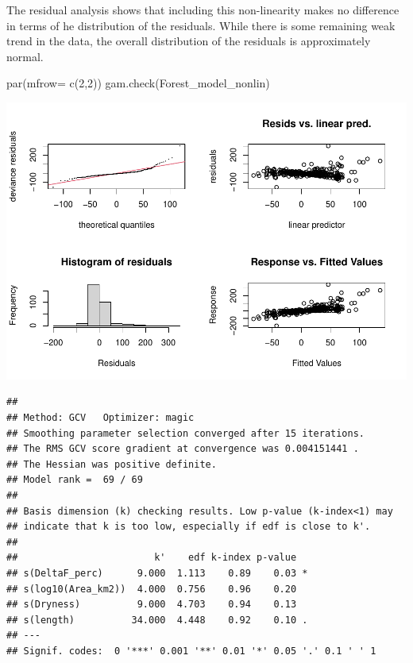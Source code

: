 \documentclass[]{elsarticle} %
\newenvironment{Shaded}{\begin{snugshade}}{\end{snugshade}}
\newcommand{\AttributeTok}[1]{\textcolor[rgb]{0.77,0.63,0.00}{#1}}
\newcommand{\DecValTok}[1]{\textcolor[rgb]{0.00,0.00,0.81}{#1}}
\newcommand{\FunctionTok}[1]{\textcolor[rgb]{0.00,0.00,0.00}{#1}}
\newcommand{\NormalTok}[1]{#1}
\begin{document}
The residual analysis shows that including this non-linearity makes no difference in terms of he distribution of the residuals. While there is some remaining weak trend in the data, the overall distribution of the residuals is approximately normal.

\begin{Shaded}
\begin{Highlighting}[]
\FunctionTok{par}\NormalTok{(}\AttributeTok{mfrow=} \FunctionTok{c}\NormalTok{(}\DecValTok{2}\NormalTok{,}\DecValTok{2}\NormalTok{))}
\FunctionTok{gam.check}\NormalTok{(Forest\_model\_nonlin)}
\end{Highlighting}
\end{Shaded}

\includegraphics{SupplementaryMaterialPart3_files/figure-latex/unnamed-chunk-11-1.pdf}

\begin{verbatim}
## 
## Method: GCV   Optimizer: magic
## Smoothing parameter selection converged after 15 iterations.
## The RMS GCV score gradient at convergence was 0.004151441 .
## The Hessian was positive definite.
## Model rank =  69 / 69 
## 
## Basis dimension (k) checking results. Low p-value (k-index<1) may
## indicate that k is too low, especially if edf is close to k'.
## 
##                        k'    edf k-index p-value  
## s(DeltaF_perc)      9.000  1.113    0.89    0.03 *
## s(log10(Area_km2))  4.000  0.756    0.96    0.20  
## s(Dryness)          9.000  4.703    0.94    0.13  
## s(length)          34.000  4.448    0.92    0.10 .
## ---
## Signif. codes:  0 '***' 0.001 '**' 0.01 '*' 0.05 '.' 0.1 ' ' 1
\end{verbatim}

\renewcommand\refname{References}

\end{document}
